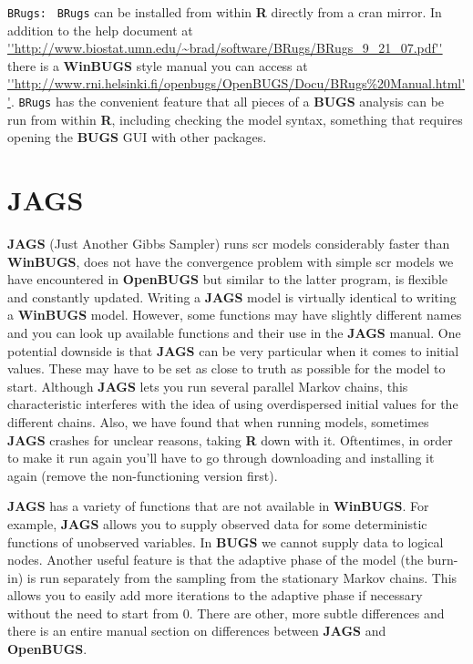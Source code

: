 {\flushleft \tt BRugs: }
{\tt BRugs} \citep{thomas_etal:2006} can be installed from within {\bf R} directly from a cran mirror. In addition to the help document at \url{''http://www.biostat.umn.edu/~brad/software/BRugs/BRugs_9_21_07.pdf''}  there is a {\bf WinBUGS} style manual you can access at \url{''http://www.rni.helsinki.fi/openbugs/OpenBUGS/Docu/BRugs%20Manual.html''}.
{\tt BRugs} has the convenient feature that all pieces of a {\bf BUGS} analysis can be run from within {\bf R}, including checking the model syntax, something that requires opening the {\bf BUGS} GUI with other packages. 



\section{JAGS}
{\bf JAGS} (Just Another Gibbs Sampler) \citep{plummer:2003} runs scr models considerably faster than {\bf WinBUGS}, does not have the convergence problem with simple scr models we have encountered in {\bf OpenBUGS} but similar to the latter program, is flexible and constantly updated. Writing a \mbox{\bf JAGS} model is virtually identical to writing a {\bf WinBUGS}
 model. However, some functions may have slightly different names and you 
 can look up available functions and their use in the {\bf JAGS} 
 manual. One potential downside is that {\bf JAGS} can be very particular 
 when it comes to initial values. These may have to be set as close to 
 truth as possible for the model to start. Although {\bf JAGS} lets 
 you run several parallel Markov chains, this characteristic interferes 
 with the idea of using overdispersed initial values for the different 
 chains. Also, we have found that when running models, sometimes {\bf JAGS} crashes for unclear reasons, taking {\bf R} down with it. Oftentimes, in order to make it run again you'll have to go through downloading and installing it again (remove the non-functioning version first).

{\bf JAGS} has a variety of functions that are 
 not available in {\bf WinBUGS}. For example, {\bf JAGS} allows you to 
 supply observed data for some deterministic functions of unobserved 
 variables. In {\bf BUGS} we cannot supply data to logical nodes. 
 Another useful feature is that the adaptive phase of the model 
 (the burn-in) is run separately from the sampling from the stationary 
 Markov chains. This allows you to easily add more iterations to the 
 adaptive phase if necessary without the need to start from 0. There 
 are other, more subtle differences and there is an entire manual section 
 on differences between {\bf JAGS} and {\bf OpenBUGS}.

